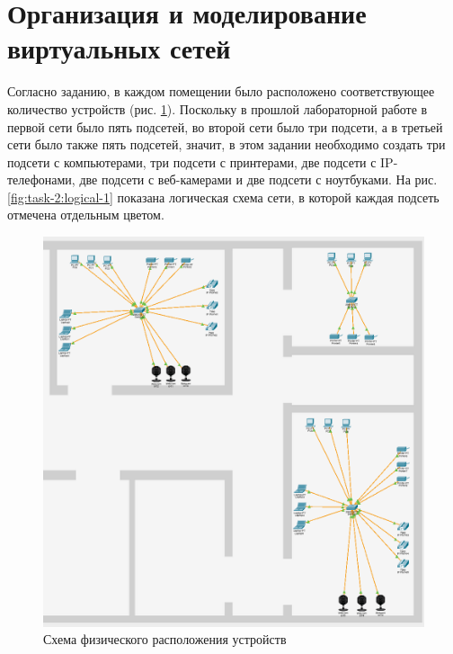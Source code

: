 \documentclass[a4paper, 14pt]{extarticle}
\begin{document}
\section{Организация и моделирование виртуальных сетей}

Согласно заданию, в каждом помещении было расположено соответствующее количество
устройств (рис. \ref{fig:task-2:physical-1}). Поскольку в прошлой лабораторной
работе в первой сети было пять подсетей, во второй сети было три подсети, а в
третьей сети было также пять подсетей, значит, в этом задании необходимо создать
три подсети с компьютерами, три подсети с принтерами, две подсети с
IP-телефонами, две подсети с веб-камерами и две подсети с ноутбуками. На рис.
\ref{fig:task-2:logical-1} показана логическая схема сети, в которой каждая
подсеть отмечена отдельным цветом.

\begin{figure}[H]
  \centering
  \includegraphics[width=\textwidth]{images/task-2/physical-1.png}
  \caption{Схема физического расположения устройств}
  \label{fig:task-2:physical-1}
\end{figure}
\end{document}
